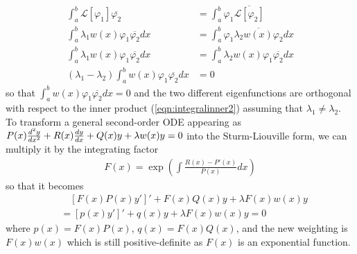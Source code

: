 \begin{align*}
\int_a^b \mathcal{L}[\varphi_1]\overline{\varphi_2} &= \int_a^b \varphi_1\overline{\mathcal{L}[\varphi_2]} \\
\int_a^b \lambda_1 w(x)\varphi_1\overline{\varphi_2} dx &= \int_a^b \varphi_1\overline{\lambda_2 w(x)\varphi_2} dx \\
\int_a^b \lambda_1 w(x)\varphi_1\overline{\varphi_2} dx &= \int_a^b \lambda_2 w(x)\varphi_1 \overline{\varphi_2} dx\\
(\lambda_1 - \lambda_2) \int_a^b w(x)\varphi_1 \overline{\varphi_2} dx &= 0
\end{align*}
so that $\int_a^b w(x)\varphi_1 \overline{\varphi_2} dx = 0$ and the two different eigenfunctions are orthogonal with respect to the inner product (\ref{eqn:integralinner2}) assuming that $\lambda_1 \neq \lambda_2$. To transform a general second-order ODE appearing as $\smash{P(x)\frac{d^2y}{dx^2} + R(x)\frac{dy}{dx}} + Q(x)y + \lambda w(x)y \allowbreak = 0$ into the Sturm-Liouville form, we can multiply it by the integrating factor 
\begin{align}
F(x) = \exp(\int \frac{R(x) - P'(x)}{P(x)} dx) \label{eqn:intfactorsl}
\end{align}
so that it becomes
\begin{align}
&\quad [F(x)P(x)y']' + F(x)Q(x)y + \lambda F(x)w(x)y \nonumber \\
&= [p(x)y']' + q(x)y + \lambda F(x)w(x)y = 0
\end{align}
\footnotemark{} where $p(x) = F(x)P(x)$, $q(x) = F(x)Q(x)$, and the new weighting is $F(x)w(x)$ which is still positive-definite as $F(x)$ is an exponential function.

